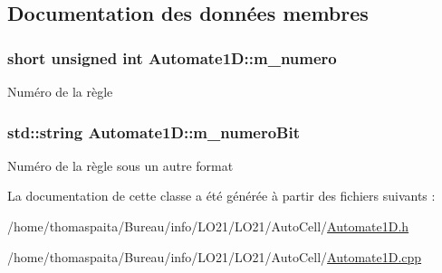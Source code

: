\subsection{Documentation des données membres}
\subsubsection[{\texorpdfstring{m\+\_\+numero}{m_numero}}]{\setlength{\rightskip}{0pt plus 5cm}short unsigned int Automate1\+D\+::m\+\_\+numero\hspace{0.3cm}{\ttfamily [protected]}}\hypertarget{class_automate1_d_a5ae877f5860e58fc17f6654b96b3aff8}{}\label{class_automate1_d_a5ae877f5860e58fc17f6654b96b3aff8}
Numéro de la règle 
\subsubsection[{\texorpdfstring{m\+\_\+numero\+Bit}{m_numeroBit}}]{\setlength{\rightskip}{0pt plus 5cm}std\+::string Automate1\+D\+::m\+\_\+numero\+Bit\hspace{0.3cm}{\ttfamily [protected]}}\hypertarget{class_automate1_d_a2a7ec50a64371b8b5dacd49844b712e3}{}\label{class_automate1_d_a2a7ec50a64371b8b5dacd49844b712e3}
Numéro de la règle sous un autre format 

La documentation de cette classe a été générée à partir des fichiers suivants \+:\begin{DoxyCompactItemize}
\item 
/home/thomaspaita/\+Bureau/info/\+L\+O21/\+L\+O21/\+Auto\+Cell/\hyperlink{_automate1_d_8h}{Automate1\+D.\+h}\item 
/home/thomaspaita/\+Bureau/info/\+L\+O21/\+L\+O21/\+Auto\+Cell/\hyperlink{_automate1_d_8cpp}{Automate1\+D.\+cpp}\end{DoxyCompactItemize}
